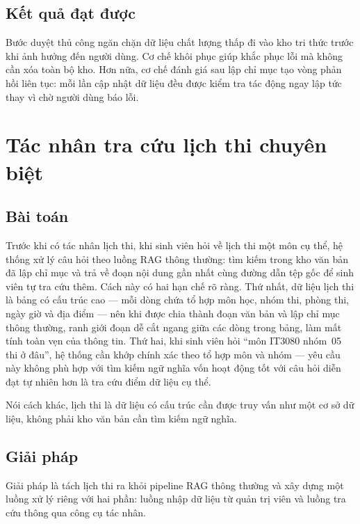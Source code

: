 \documentclass[../DoAn.tex]{subfiles}
\begin{document}
\subsection{Kết quả đạt được}

Bước duyệt thủ công ngăn chặn dữ liệu chất lượng thấp đi vào kho tri thức trước
khi ảnh hưởng đến người dùng. Cơ chế khôi phục giúp khắc phục lỗi mà không cần
xóa toàn bộ kho. Hơn nữa, cơ chế đánh giá sau lập chỉ mục tạo vòng phản hồi
liên tục: mỗi lần cập nhật dữ liệu đều được kiểm tra tác động ngay lập tức thay
vì chờ người dùng báo lỗi.

\section{Tác nhân tra cứu lịch thi chuyên biệt}
\label{sec:ch5-exam-agent}

\subsection{Bài toán}

Trước khi có tác nhân lịch thi, khi sinh viên hỏi về lịch thi một môn cụ thể,
hệ thống xử lý câu hỏi theo luồng RAG thông thường: tìm kiếm trong kho văn bản
đã lập chỉ mục và trả về đoạn nội dung gần nhất cùng đường dẫn tệp gốc để sinh
viên tự tra cứu thêm. Cách này có hai hạn chế rõ ràng. Thứ nhất, dữ liệu lịch
thi là bảng có cấu trúc cao --- mỗi dòng chứa tổ hợp môn học, nhóm thi, phòng
thi, ngày giờ và địa điểm --- nên khi được chia thành đoạn văn bản và lập chỉ
mục thông thường, ranh giới đoạn dễ cắt ngang giữa các dòng trong bảng, làm mất
tính toàn vẹn của thông tin. Thứ hai, khi sinh viên hỏi ``môn IT3080 nhóm~05
thi ở đâu'', hệ thống cần khớp chính xác theo tổ hợp môn và nhóm --- yêu cầu
này không phù hợp với tìm kiếm ngữ nghĩa vốn hoạt động tốt với câu hỏi diễn đạt
tự nhiên hơn là tra cứu điểm dữ liệu cụ thể.

Nói cách khác, lịch thi là dữ liệu có cấu trúc cần được truy vấn như một cơ sở
dữ liệu, không phải kho văn bản cần tìm kiếm ngữ nghĩa.

\subsection{Giải pháp}

Giải pháp là tách lịch thi ra khỏi pipeline RAG thông thường và xây dựng một
luồng xử lý riêng với hai phần: luồng nhập dữ liệu từ quản trị viên và luồng
tra cứu thông qua công cụ tác nhân.
\end{document}
